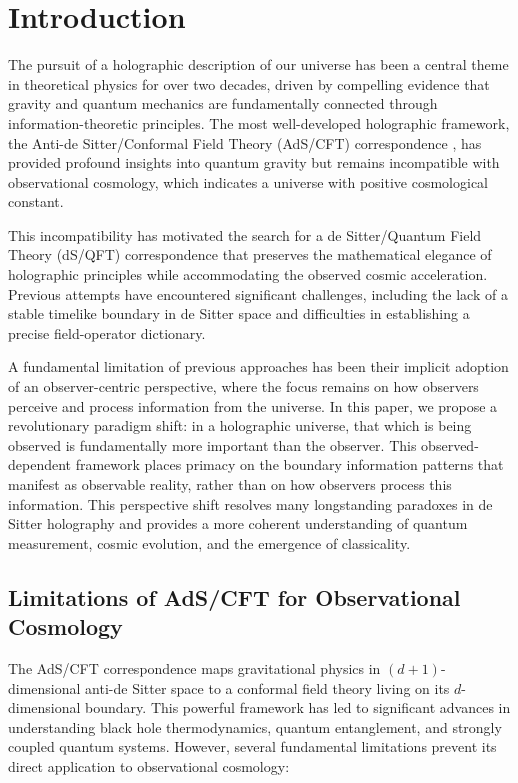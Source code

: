 \documentclass[11pt,english,twoside]{article}
\theoremstyle{plain}
\theoremstyle{definition}
\theoremstyle{remark}
\begin{document}
\section{Introduction}
\label{sec:intro}

The pursuit of a holographic description of our universe has been a central theme in theoretical physics for over two decades, driven by compelling evidence that gravity and quantum mechanics are fundamentally connected through information-theoretic principles. The most well-developed holographic framework, the Anti-de Sitter/Conformal Field Theory (AdS/CFT) correspondence \cite{Maldacena1999}, has provided profound insights into quantum gravity but remains incompatible with observational cosmology, which indicates a universe with positive cosmological constant.

This incompatibility has motivated the search for a de Sitter/Quantum Field Theory (dS/QFT) correspondence that preserves the mathematical elegance of holographic principles while accommodating the observed cosmic acceleration. Previous attempts \cite{Strominger2001,Witten2001} have encountered significant challenges, including the lack of a stable timelike boundary in de Sitter space and difficulties in establishing a precise field-operator dictionary.

A fundamental limitation of previous approaches has been their implicit adoption of an observer-centric perspective, where the focus remains on how observers perceive and process information from the universe. In this paper, we propose a revolutionary paradigm shift: in a holographic universe, that which is being observed is fundamentally more important than the observer. This observed-dependent framework places primacy on the boundary information patterns that manifest as observable reality, rather than on how observers process this information. This perspective shift resolves many longstanding paradoxes in de Sitter holography and provides a more coherent understanding of quantum measurement, cosmic evolution, and the emergence of classicality.

\subsection{Limitations of AdS/CFT for Observational Cosmology}
\label{subsec:limitations}

The AdS/CFT correspondence maps gravitational physics in $(d+1)$-dimensional anti-de Sitter space to a conformal field theory living on its $d$-dimensional boundary. This powerful framework has led to significant advances in understanding black hole thermodynamics, quantum entanglement, and strongly coupled quantum systems. However, several fundamental limitations prevent its direct application to observational cosmology:
\end{document}
